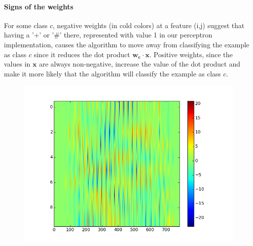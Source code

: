 \paragraph{Signs of the weights} For some class $c$, negative weights (in cold colors) at a feature (i,j) suggest that having a '+' or '\#' there, represented with value 1 in our perceptron implementation, causes the algorithm to move away from classifying the example as class $c$ since it reduces the dot product $\mathbf{w_c} \cdot \mathbf{x}$. Positive weights, since the values in $\mathbf{x}$ are always non-negative, increase the value of the dot product and make it more likely that the algorithm will classify the example as class $c$.

\begin{figure}[H]
\centering
\includegraphics[width=1\textwidth]{graphics/weights_plot.png}
\end{figure}